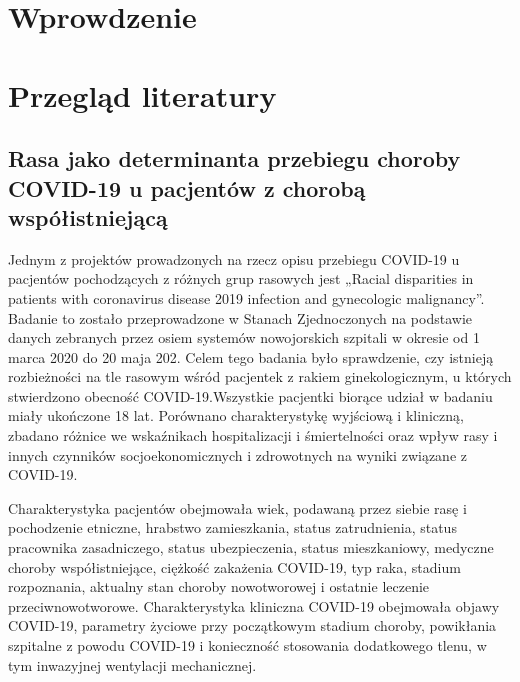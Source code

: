 \documentclass[polish, twoside, 12pt, a4paper]{article}
\theoremstyle{definition}
\theoremstyle{plain}
\theoremstyle{remark}
\begin{document}
\section{Wprowdzenie}


\cleardoublepage
\section{Przegląd literatury}
\label{chapter:przeglad-literatury}
\subsection{Rasa jako determinanta przebiegu choroby COVID-19 u pacjentów z chorobą współistniejącą}

Jednym z projektów prowadzonych na rzecz opisu przebiegu COVID-19 u pacjentów pochodzących z różnych grup rasowych jest „Racial disparities in patients with coronavirus disease 2019 infection and gynecologic malignancy”. Badanie to zostało przeprowadzone w Stanach Zjednoczonych na podstawie danych zebranych przez osiem systemów nowojorskich szpitali w okresie od 1 marca 2020 do 20 maja 202. Celem tego badania było sprawdzenie, czy istnieją rozbieżności na tle rasowym wśród pacjentek z rakiem ginekologicznym, u których stwierdzono obecność COVID-19.Wszystkie pacjentki biorące udział w badaniu miały ukończone 18 lat. Porównano charakterystykę wyjściową i kliniczną, zbadano różnice we wskaźnikach hospitalizacji i śmiertelności oraz wpływ rasy i innych czynników socjoekonomicznych i zdrowotnych na wyniki związane z COVID-19. 

Charakterystyka pacjentów obejmowała wiek, podawaną przez siebie rasę i pochodzenie etniczne, hrabstwo zamieszkania, status zatrudnienia, status pracownika zasadniczego, status ubezpieczenia, status mieszkaniowy, medyczne choroby współistniejące, ciężkość zakażenia COVID-19, typ raka, stadium rozpoznania, aktualny stan choroby nowotworowej i ostatnie leczenie przeciwnowotworowe.  Charakterystyka kliniczna COVID-19 obejmowała objawy COVID-19, parametry życiowe przy początkowym stadium choroby, powikłania szpitalne z powodu COVID-19 i konieczność stosowania dodatkowego tlenu, w tym inwazyjnej wentylacji mechanicznej. 
\end{document}
